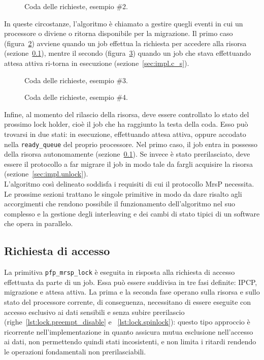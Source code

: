 \begin{figure}
\centering
{}
\caption{Coda delle richieste, esempio \#2.}
\label{fig:impl.queue2}
\end{figure}

In queste circostanze, l'algoritmo è chiamato a gestire quegli eventi in cui un processore o diviene o ritorna disponibile per la migrazione. Il primo caso (figura~\ref{fig:impl.queue3}) avviene quando un job effettua la richiesta per accedere alla risorsa (sezione~\ref{sec:impl.lock}), mentre il secondo (figura~\ref{fig:impl.queue4}) quando un job che stava effettuando attesa attiva ri-torna in esecuzione (sezione~\ref{sec:impl.c_s}).\\

\begin{figure}
\centering
{}
\caption{Coda delle richieste, esempio \#3.}
\label{fig:impl.queue3}
\end{figure}

\begin{figure}
\centering
{}
\caption{Coda delle richieste, esempio \#4.}
\label{fig:impl.queue4}
\end{figure}

Infine, al momento del rilascio della risorsa, deve essere controllato lo stato del prossimo lock holder, cioè il job che ha raggiunto la testa della coda. Esso può trovarsi in due stati: in esecuzione, effettuando attesa attiva, oppure accodato nella \texttt{ready\_queue} del proprio processore. Nel primo caso, il job entra in possesso della risorsa autonomamente (sezione~\ref{sec:impl.lock}). Se invece è stato prerilasciato, deve essere il protocollo a far migrare il job in modo tale da fargli acquisire la risorsa (sezione~\ref{sec:impl.unlock}).\\

L'algoritmo così delineato soddisfa i requisiti di cui il protocollo MrsP necessita. Le prossime sezioni trattano le singole primitive in modo da dare risalto agli accorgimenti che rendono possibile il funzionamento dell'algoritmo nel suo complesso e la gestione degli interleaving e dei cambi di stato tipici di un software che opera in parallelo.

\subsection{Richiesta di accesso}
\label{sec:impl.lock}

La primitiva \texttt{pfp\_mrsp\_lock} è eseguita in risposta alla richiesta di accesso effettuata da parte di un job. Essa può essere suddivisa in tre fasi definite: IPCP, migrazione e attesa attiva. La prima e la seconda fase operano sulla risorsa e sullo stato del processore corrente, di conseguenza, necessitano di essere eseguite con accesso esclusivo ai dati sensibili e senza subire prerilascio (righe~\ref{lst:lock.preempt_disable} e ~\ref{lst:lock.spinlock}): questo tipo approccio è ricorrente nell'implementazione in quanto assicura mutua esclusione nell'accesso ai dati, non permettendo quindi stati incosistenti, e non limita i ritardi rendendo le operazioni fondamentali non prerilasciabili.\\

